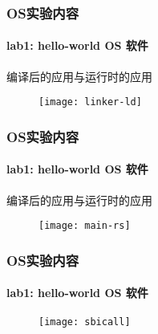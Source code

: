 \begin{frame}
    \frametitle{OS实验内容}
    \framesubtitle{lab1: hello-world OS  软件}
    
    编译后的应用与运行时的应用
    \begin{figure}
        \centering
        \texttt{[image: linker-ld]} %
    \end{figure}
\end{frame}

\begin{frame}
    \frametitle{OS实验内容}
    \framesubtitle{lab1: hello-world OS  软件}
    
    编译后的应用与运行时的应用
    \begin{figure}
        \centering
        \texttt{[image: main-rs]} %
    \end{figure}
\end{frame}


\begin{frame}
    \frametitle{OS实验内容}
    \framesubtitle{lab1: hello-world OS  软件}
    
    \begin{figure}
        \centering
        \texttt{[image: sbicall]} %
    \end{figure}
\end{frame}

